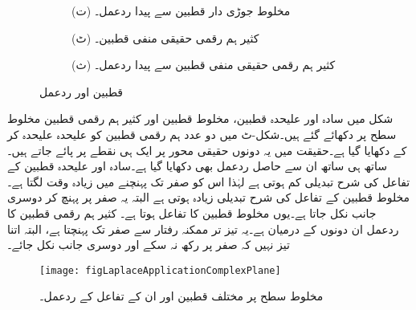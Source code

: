 \begin{figure}
\begin{subfigure}{0.5\textwidth}
\caption*{(ت) مخلوط جوڑی دار قطبین سے پیدا ردعمل۔}
\end{subfigure}
\begin{subfigure}{0.5\textwidth}
\centering
{}
\caption*{(ٹ) کثیر ہم رقمی حقیقی منفی قطبین۔}
\end{subfigure}%
\begin{subfigure}{0.5\textwidth}
\centering
{}
\caption*{(ث) کثیر ہم رقمی حقیقی منفی قطبین سے پیدا ردعمل۔}
\end{subfigure}
\caption{قطبین اور ردعمل}
\label{شکل_لاپلاس_استعمال_قطبین_اور_ردعمل}
\end{figure}

شکل  میں سادہ اور علیحدہ قطبین، مخلوط قطبین اور کثیر  ہم رقمی قطبین مخلوط سطح پر دکھائے گئے ہیں۔شکل-ٹ میں دو عدد ہم رقمی قطبین کو علیحدہ علیحدہ کر کے دکھایا گیا ہے۔حقیقت میں یہ دونوں حقیقی محور پر ایک ہی نقطے پر پائے جاتے ہیں۔ساتھ ہی ساتھ ان سے حاصل ردعمل بھی دکھایا گیا ہے۔سادہ اور علیحدہ قطبین کے تفاعل  کی شرح تبدیلی کم ہوتی ہے لہٰذا اس کو صفر تک پہنچنے میں زیادہ وقت لگتا ہے۔ مخلوط قطبین کے تفاعل کی شرح تبدیلی زیادہ ہوتی ہے البتہ یہ صفر پر پہنچ کر دوسری جانب نکل جاتا ہے۔یوں مخلوط قطبین کا تفاعل  ہوتا ہے۔ کثیر ہم رقمی قطبین کا ردعمل ان دونوں کے درمیان ہے۔یہ تیز تر ممکنہ رفتار سے صفر تک پہنچتا ہے، البتہ اتنا تیز نہیں کہ صفر پر رکھ نہ سکے اور دوسری جانب نکل جائے۔

\begin{figure}
\centering
\texttt{[image: figLaplaceApplicationComplexPlane]}
\caption{مخلوط سطح پر مختلف قطبین اور ان کے تفاعل کے ردعمل۔}
\label{شکل_لاپلاس_استعمال_مختلف_قطبین}
\end{figure}

